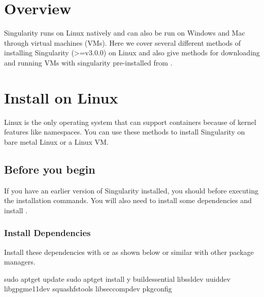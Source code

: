 \documentclass[letterpaper,10pt,english]{sphinxmanual}
\begin{document}
\section{Overview}
\label{\detokenize{installation:overview}}
Singularity runs on Linux natively and can also be run on Windows and Mac
through virtual machines (VMs). Here we cover several different methods of
installing Singularity (\textgreater{}=v3.0.0) on Linux and also give methods for downloading
and running VMs with singularity pre-installed from .


\section{Install on Linux}
\label{\detokenize{installation:install-on-linux}}
Linux is the only operating system that can support containers because of
kernel features like namespaces.  You can use these methods to install
Singularity on bare metal Linux or a Linux VM.


\subsection{Before you begin}
\label{\detokenize{installation:before-you-begin}}
If you have an earlier version of Singularity installed, you should {\hyperref[\detokenize{installation:remove-an-old-version}]{}} before executing the installation commands.  You
will also need to install some dependencies and install .


\subsubsection{Install Dependencies}
\label{\detokenize{installation:install-dependencies}}\label{\detokenize{installation:id2}}
Install these dependencies with  or  as shown below or
similar with other package managers.


%
\begin{sphinxVerbatim}[commandchars=\\\{\}]
\PYGZdl{} sudo apt\PYGZhy{}get update \PYGZam{}\PYGZam{} sudo apt\PYGZhy{}get install \PYGZhy{}y \PYGZbs{}
    build\PYGZhy{}essential \PYGZbs{}
    libssl\PYGZhy{}dev \PYGZbs{}
    uuid\PYGZhy{}dev \PYGZbs{}
    libgpgme11\PYGZhy{}dev \PYGZbs{}
    squashfs\PYGZhy{}tools \PYGZbs{}
    libseccomp\PYGZhy{}dev \PYGZbs{}
    pkg\PYGZhy{}config
\end{sphinxVerbatim}
\end{document}
